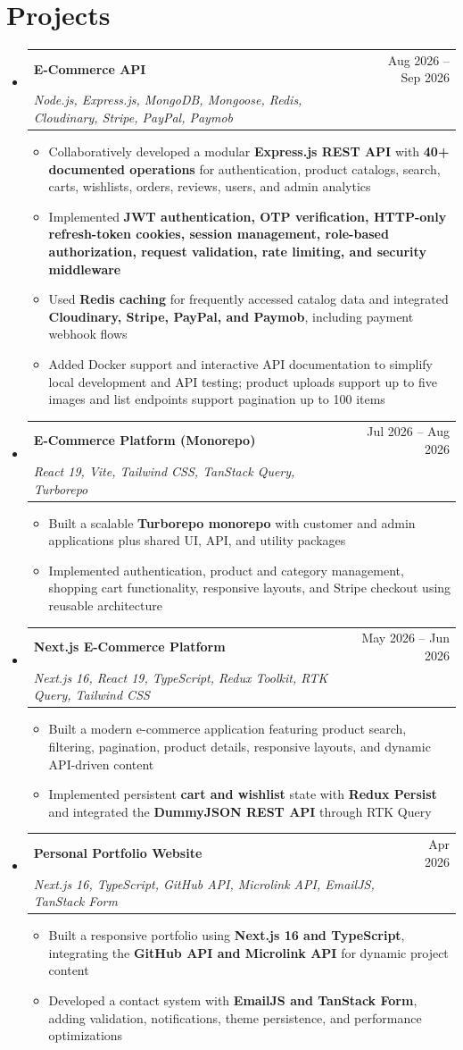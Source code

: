 \documentclass[letterpaper,11pt]{article}
\makeatletter
\newcommand{\resumeItem}[1]{
  \item\small{
    {#1 \vspace{-2pt}}
  }
}
\newcommand{\resumeSubheading}[4]{
  \vspace{-2pt}\item
  \begin{tabular*}{0.97\textwidth}[t]{l@{\extracolsep{\fill}}r}
    \textbf{#1} & #2 \\
    \textit{\small#3} & \textit{\small #4} \\
  \end{tabular*}\vspace{-7pt}
}
\newcommand{\resumeSubHeadingListStart}{\begin{itemize}[leftmargin=0.15in, label={}]}
\newcommand{\resumeSubHeadingListEnd}{\end{itemize}}
\newcommand{\resumeItemListStart}{\begin{itemize}}
\newcommand{\resumeItemListEnd}{\end{itemize}\vspace{-5pt}}
\makeatother
\begin{document}
\section{Projects}
  \resumeSubHeadingListStart
    \resumeSubheading
      {\textbf{E-Commerce API}}{Aug 2026 -- Sep 2026}
      {\emph{Node.js, Express.js, MongoDB, Mongoose, Redis, Cloudinary, Stripe, PayPal, Paymob}}{}
      \resumeItemListStart
        \resumeItem{Collaboratively developed a modular \textbf{Express.js REST API} with \textbf{40+ documented operations} for authentication, product catalogs, search, carts, wishlists, orders, reviews, users, and admin analytics}
        \resumeItem{Implemented \textbf{JWT authentication, OTP verification, HTTP-only refresh-token cookies, session management, role-based authorization, request validation, rate limiting, and security middleware}}
        \resumeItem{Used \textbf{Redis caching} for frequently accessed catalog data and integrated \textbf{Cloudinary, Stripe, PayPal, and Paymob}, including payment webhook flows}
        \resumeItem{Added Docker support and interactive API documentation to simplify local development and API testing; product uploads support up to five images and list endpoints support pagination up to 100 items}
      \resumeItemListEnd
    \resumeSubheading
      {\textbf{E-Commerce Platform (Monorepo)}}{Jul 2026 -- Aug 2026}
      {\emph{React 19, Vite, Tailwind CSS, TanStack Query, Turborepo}}{}
      \resumeItemListStart
        \resumeItem{Built a scalable \textbf{Turborepo monorepo} with customer and admin applications plus shared UI, API, and utility packages}
        \resumeItem{Implemented authentication, product and category management, shopping cart functionality, responsive layouts, and Stripe checkout using reusable architecture}
      \resumeItemListEnd
    \resumeSubheading
      {\textbf{Next.js E-Commerce Platform}}{May 2026 -- Jun 2026}
      {\emph{Next.js 16, React 19, TypeScript, Redux Toolkit, RTK Query, Tailwind CSS}}{}
      \resumeItemListStart
        \resumeItem{Built a modern e-commerce application featuring product search, filtering, pagination, product details, responsive layouts, and dynamic API-driven content}
        \resumeItem{Implemented persistent \textbf{cart and wishlist} state with \textbf{Redux Persist} and integrated the \textbf{DummyJSON REST API} through RTK Query}
      \resumeItemListEnd
    \resumeSubheading
      {\textbf{Personal Portfolio Website}}{Apr 2026}
      {\emph{Next.js 16, TypeScript, GitHub API, Microlink API, EmailJS, TanStack Form}}{}
      \resumeItemListStart
        \resumeItem{Built a responsive portfolio using \textbf{Next.js 16 and TypeScript}, integrating the \textbf{GitHub API and Microlink API} for dynamic project content}
        \resumeItem{Developed a contact system with \textbf{EmailJS and TanStack Form}, adding validation, notifications, theme persistence, and performance optimizations}
      \resumeItemListEnd
  \resumeSubHeadingListEnd

\end{document}
